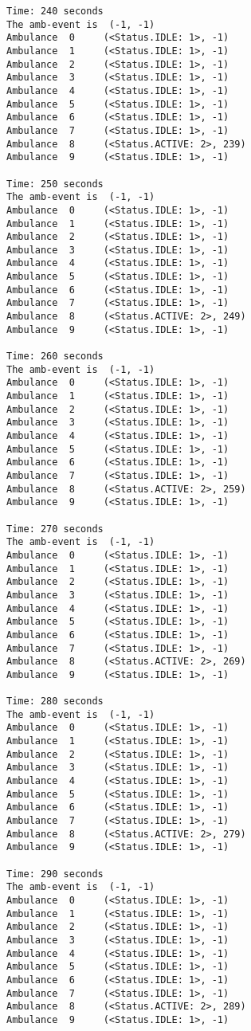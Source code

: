 \documentclass[11pt]{article}
\begin{document}
\begin{Verbatim}[commandchars=\\\{\}]
Time: 240 seconds
The amb-event is  (-1, -1)
Ambulance  0	 (<Status.IDLE: 1>, -1)
Ambulance  1	 (<Status.IDLE: 1>, -1)
Ambulance  2	 (<Status.IDLE: 1>, -1)
Ambulance  3	 (<Status.IDLE: 1>, -1)
Ambulance  4	 (<Status.IDLE: 1>, -1)
Ambulance  5	 (<Status.IDLE: 1>, -1)
Ambulance  6	 (<Status.IDLE: 1>, -1)
Ambulance  7	 (<Status.IDLE: 1>, -1)
Ambulance  8	 (<Status.ACTIVE: 2>, 239)
Ambulance  9	 (<Status.IDLE: 1>, -1)

Time: 250 seconds
The amb-event is  (-1, -1)
Ambulance  0	 (<Status.IDLE: 1>, -1)
Ambulance  1	 (<Status.IDLE: 1>, -1)
Ambulance  2	 (<Status.IDLE: 1>, -1)
Ambulance  3	 (<Status.IDLE: 1>, -1)
Ambulance  4	 (<Status.IDLE: 1>, -1)
Ambulance  5	 (<Status.IDLE: 1>, -1)
Ambulance  6	 (<Status.IDLE: 1>, -1)
Ambulance  7	 (<Status.IDLE: 1>, -1)
Ambulance  8	 (<Status.ACTIVE: 2>, 249)
Ambulance  9	 (<Status.IDLE: 1>, -1)

Time: 260 seconds
The amb-event is  (-1, -1)
Ambulance  0	 (<Status.IDLE: 1>, -1)
Ambulance  1	 (<Status.IDLE: 1>, -1)
Ambulance  2	 (<Status.IDLE: 1>, -1)
Ambulance  3	 (<Status.IDLE: 1>, -1)
Ambulance  4	 (<Status.IDLE: 1>, -1)
Ambulance  5	 (<Status.IDLE: 1>, -1)
Ambulance  6	 (<Status.IDLE: 1>, -1)
Ambulance  7	 (<Status.IDLE: 1>, -1)
Ambulance  8	 (<Status.ACTIVE: 2>, 259)
Ambulance  9	 (<Status.IDLE: 1>, -1)

Time: 270 seconds
The amb-event is  (-1, -1)
Ambulance  0	 (<Status.IDLE: 1>, -1)
Ambulance  1	 (<Status.IDLE: 1>, -1)
Ambulance  2	 (<Status.IDLE: 1>, -1)
Ambulance  3	 (<Status.IDLE: 1>, -1)
Ambulance  4	 (<Status.IDLE: 1>, -1)
Ambulance  5	 (<Status.IDLE: 1>, -1)
Ambulance  6	 (<Status.IDLE: 1>, -1)
Ambulance  7	 (<Status.IDLE: 1>, -1)
Ambulance  8	 (<Status.ACTIVE: 2>, 269)
Ambulance  9	 (<Status.IDLE: 1>, -1)

Time: 280 seconds
The amb-event is  (-1, -1)
Ambulance  0	 (<Status.IDLE: 1>, -1)
Ambulance  1	 (<Status.IDLE: 1>, -1)
Ambulance  2	 (<Status.IDLE: 1>, -1)
Ambulance  3	 (<Status.IDLE: 1>, -1)
Ambulance  4	 (<Status.IDLE: 1>, -1)
Ambulance  5	 (<Status.IDLE: 1>, -1)
Ambulance  6	 (<Status.IDLE: 1>, -1)
Ambulance  7	 (<Status.IDLE: 1>, -1)
Ambulance  8	 (<Status.ACTIVE: 2>, 279)
Ambulance  9	 (<Status.IDLE: 1>, -1)

Time: 290 seconds
The amb-event is  (-1, -1)
Ambulance  0	 (<Status.IDLE: 1>, -1)
Ambulance  1	 (<Status.IDLE: 1>, -1)
Ambulance  2	 (<Status.IDLE: 1>, -1)
Ambulance  3	 (<Status.IDLE: 1>, -1)
Ambulance  4	 (<Status.IDLE: 1>, -1)
Ambulance  5	 (<Status.IDLE: 1>, -1)
Ambulance  6	 (<Status.IDLE: 1>, -1)
Ambulance  7	 (<Status.IDLE: 1>, -1)
Ambulance  8	 (<Status.ACTIVE: 2>, 289)
Ambulance  9	 (<Status.IDLE: 1>, -1)


\end{Verbatim}
\end{document}
